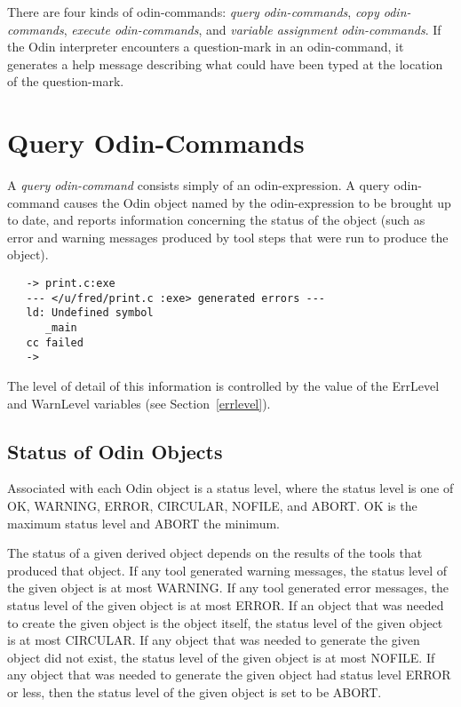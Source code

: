 There are four kinds of odin-commands: {\em query odin-commands},
{\em copy odin-commands}, {\em execute odin-commands},
and {\em variable assignment odin-commands}.
If the Odin interpreter encounters a question-mark in an odin-command,
it generates a help message describing what could have been
typed at the location of the question-mark.


\section{Query Odin-Commands}
\label{query}

A {\em query odin-command} consists simply of an odin-expression.
A query odin-command causes the Odin object named by the odin-expression
to be brought up to date,
and reports information concerning the status of the object
(such as error and warning messages produced by tool steps that were run
to produce the object).
\begin{verbatim}
   -> print.c:exe
   --- </u/fred/print.c :exe> generated errors ---
   ld: Undefined symbol 
      _main 
   cc failed
   ->
\end{verbatim}
The level of detail of this information is controlled by the value of the
{\ex ErrLevel} and {\ex WarnLevel} variables (see Section~\ref{errlevel}).

\subsection{Status of Odin Objects}

Associated with each Odin object is a status level,
where the status level is one of {\ex OK}, {\ex WARNING}, {\ex ERROR},
{\ex CIRCULAR}, {\ex NOFILE}, and {\ex ABORT}.
{\ex OK} is the maximum status level and {\ex ABORT} the minimum.

The status of a given derived object depends on
the results of the tools that produced that object.
If any tool generated warning messages,
the status level of the given object is at most {\ex WARNING}.
If any tool generated error messages,
the status level of the given object is at most {\ex ERROR}.
If an object that was needed to create the
given object is the object itself,
the status level of the given object is at most {\ex CIRCULAR}.
If any object that was needed to generate the given object did not exist,
the status level of the given object is at most {\ex NOFILE}.
If any object that was needed to
generate the given object had status level {\ex ERROR} or less,
then the status level of the given object is set to be {\ex ABORT}.

